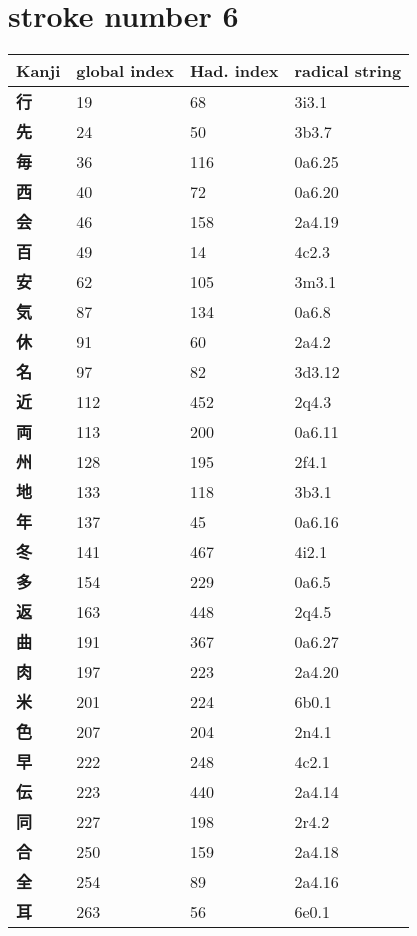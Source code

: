 \section{stroke number 6}
  \begin{longtable}[c]{llll}
    \bfseries Kanji & \bfseries global index & \bfseries Had. index & \bfseries radical string\\\hline\endhead
    \bfseries 行 & 19 & 68 & 3i3.1\\
    \bfseries 先 & 24 & 50 & 3b3.7\\
    \bfseries 毎 & 36 & 116 & 0a6.25\\
    \bfseries 西 & 40 & 72 & 0a6.20\\
    \bfseries 会 & 46 & 158 & 2a4.19\\
    \bfseries 百 & 49 & 14 & 4c2.3\\
    \bfseries 安 & 62 & 105 & 3m3.1\\
    \bfseries 気 & 87 & 134 & 0a6.8\\
    \bfseries 休 & 91 & 60 & 2a4.2\\
    \bfseries 名 & 97 & 82 & 3d3.12\\
    \bfseries 近 & 112 & 452 & 2q4.3\\
    \bfseries 両 & 113 & 200 & 0a6.11\\
    \bfseries 州 & 128 & 195 & 2f4.1\\
    \bfseries 地 & 133 & 118 & 3b3.1\\
    \bfseries 年 & 137 & 45 & 0a6.16\\
    \bfseries 冬 & 141 & 467 & 4i2.1\\
    \bfseries 多 & 154 & 229 & 0a6.5\\
    \bfseries 返 & 163 & 448 & 2q4.5\\
    \bfseries 曲 & 191 & 367 & 0a6.27\\
    \bfseries 肉 & 197 & 223 & 2a4.20\\
    \bfseries 米 & 201 & 224 & 6b0.1\\
    \bfseries 色 & 207 & 204 & 2n4.1\\
    \bfseries 早 & 222 & 248 & 4c2.1\\
    \bfseries 伝 & 223 & 440 & 2a4.14\\
    \bfseries 同 & 227 & 198 & 2r4.2\\
    \bfseries 合 & 250 & 159 & 2a4.18\\
    \bfseries 全 & 254 & 89 & 2a4.16\\
    \bfseries 耳 & 263 & 56 & 6e0.1\\

\end{longtable}
